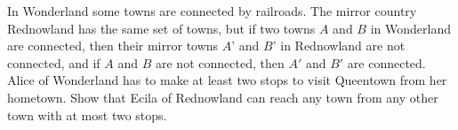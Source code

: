 In Wonderland some towns are connected by railroads. The mirror country Rednowland has the same set of towns, but if two towns $A$ and $B$ in Wonderland are connected, then their mirror towns $A$' and $B$' in Rednowland are not connected, and if $A$ and $B$ are not connected, then $A'$ and $B'$ are connected. Alice of Wonderland has to make at least two stops to visit Queentown from her hometown. Show that Ecila of Rednowland can reach any town from any other town with at most two stops.
